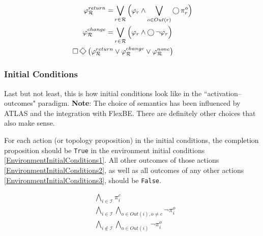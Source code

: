 \begin{subequations}
	\begin{align}
		\varphi_\mathcal{R}^{return} = &\bigvee \limits_{r \in \mathcal{R}} \Big( \varphi_r \wedge \bigvee \limits_{o \in Out(r)} \LTLX \pi_r^o \Big)\label{TopologyFairnessConditionsFormula1}\\
		\varphi_\mathcal{R}^{change} = &\bigvee \limits_{r \in \mathcal{R}} \Big( \varphi_r \wedge \LTLX \lnot \varphi_r \Big)\label{TopologyFairnessConditionsFormula2}\\
		\LTLG \LTLF \big( \varphi_\mathcal{R}^{return} &\vee \varphi_\mathcal{R}^{change} \vee \varphi_\mathcal{R}^{none} \big)\label{TopologyFairnessConditionsFormula}
	\end{align}
\end{subequations}


\subsubsection{Initial Conditions}

Last but not least, this is how initial conditions look like in the ``activation--outcomes" paradigm.
\textbf{Note}: The choice of semantics has been influenced by ATLAS and the integration with FlexBE. There are definitely other choices that also make sense.

For each action (or topology proposition) in the initial conditions, the completion proposition should be \texttt{True} in the environment initial conditions \eqref{EnvironmentInitialConditions1}.
All other outcomes of those actions \eqref{EnvironmentInitialConditions2}, as well as all outcomes of any other actions \eqref{EnvironmentInitialConditions3}, should be \texttt{False}.

\begin{subequations}
	\label{EnvironmentInitialConditions}
	\begin{align}
		&\bigwedge \limits_{i \in \mathcal{I}} \pi_i^c \label{EnvironmentInitialConditions1}\\
		&\bigwedge \limits_{i \in \mathcal{I}} \bigwedge \limits_{o \in Out(i), o \neq c} \lnot \pi_i^o \label{EnvironmentInitialConditions2}\\
		&\bigwedge \limits_{i \not\in \mathcal{I}} \bigwedge \limits_{o \in Out(i)} \lnot \pi_i^o\label{EnvironmentInitialConditions3}
	\end{align}
\end{subequations}

